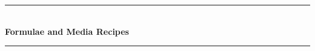 \documentclass[idxtotoc,hyperref,openany]{labbook} %
\newcommand{\HRule}{\rule{\linewidth}{0.5mm}} %
\begin{document}
\begin{center}
\HRule \\[0.4cm]
{\huge \textbf{Formulae and Media Recipes}}\\[0.4cm] %
\HRule \\[1.5cm]
\end{center}


\newpage





\newpage




\end{document}

